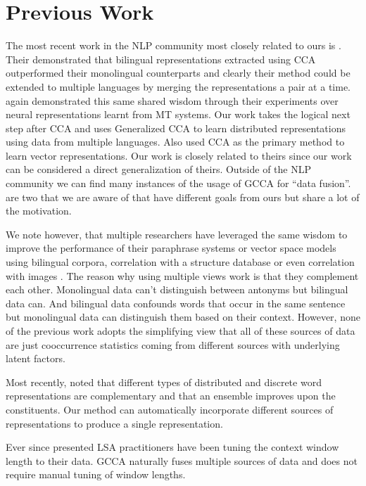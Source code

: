 \documentclass[11pt]{article}
\begin{document}
\section{Previous Work}
\label{sec:previouswork}
The most recent work in the NLP community most closely related to ours is \cite{faruqui2014improving}.
Their demonstrated that bilingual representations extracted using CCA outperformed their monolingual
counterparts and  clearly their method could be extended to
multiple languages by merging the representations a pair at a time.
\cite{felix2014learning} again demonstrated this same
shared wisdom through their experiments over neural representations learnt from MT
systems. Our work takes the logical
next step after CCA and uses Generalized CCA to learn distributed
representations using data from multiple languages. Also \cite{dhillon2011multi,dhillon2012two} used
CCA as the primary method to learn vector representations. Our work
is closely related to theirs since our 
work can be considered a direct generalization of theirs. Outside of
the NLP community we can find many instances of the usage of GCCA for
``data fusion''.  \cite{sun2013generalized,tripathi2011data} are two
that we are aware of that have different goals from ours but share a
lot of the motivation.

We note however, that multiple researchers have leveraged the
same wisdom to improve the performance of their paraphrase systems or
vector space models using bilingual
corpora\cite{bannard2005paraphrasing,Huang2012Improving,zou2013bilingual}, 
correlation with a structure database \cite{yu2014improving} or even
correlation with images \cite{bruni2012distributional}. The reason why using multiple views work is 
that they complement each other. Monolingual data can't distinguish
between antonyms but bilingual data can. And bilingual data confounds
words that occur in the same sentence but monolingual data can
distinguish them based on their context. However, none of the previous
work adopts the simplifying  view that 
all of these sources of data are just cooccurrence 
statistics coming from different sources with underlying latent
factors. 

Most recently, \cite{bansal2014tailoring} noted that  different
types of distributed and discrete word representations are
complementary and that an ensemble  improves upon the
constituents. Our method can automatically incorporate different
sources of representations to produce a single representation.

Ever since \cite{landauer1997solution} presented LSA practitioners have
been tuning the context window length to their data. GCCA naturally fuses
multiple sources of data and does not require manual tuning of window lengths. 
\end{document}
